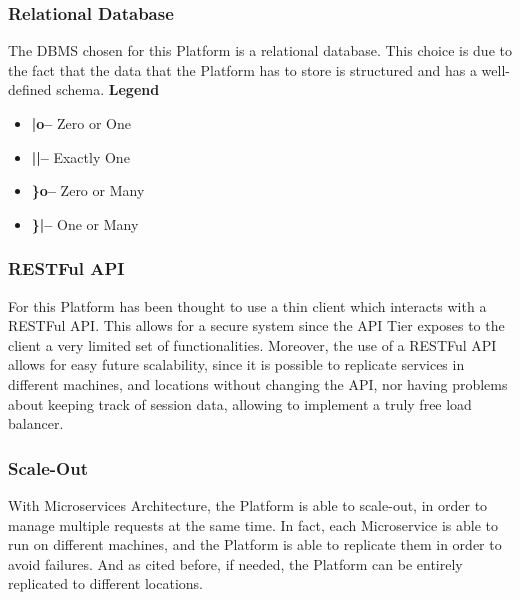 \subsubsection{Relational Database}
The DBMS chosen for this Platform is a relational database. This choice is due to the fact that the data that the Platform has to store is structured and has a well-defined schema.
\textbf{Legend}
\begin{itemize}
    \item \textbf{|o--} Zero or One
    \item \textbf{||--} Exactly One
    \item \textbf{\}o--} Zero or Many
    \item \textbf{\}|--} One or Many
\end{itemize}
\newpage

\subsubsection{RESTFul API} \label{parr:restful}
For this Platform has been thought to use a thin client which interacts with a RESTFul API. This allows for a secure system since the API Tier exposes to the client a very limited set of functionalities. 
Moreover, the use of a RESTFul API allows for easy future scalability, since it is possible to replicate services in different machines, and locations without changing the API, nor having problems about keeping track of session data, allowing to implement a truly free load balancer. 

\subsubsection{Scale-Out}
With Microservices Architecture, the Platform is able to scale-out, in order to manage multiple requests at the same time. In fact, each Microservice is able to run on different machines, and the Platform is able to replicate them in order to avoid failures. And as cited before, if needed, the Platform can be entirely replicated to different locations.
